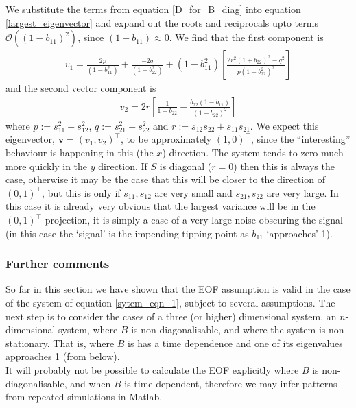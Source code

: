 \documentclass[11pt,a4paper,reqno]{article}
\numberwithin{equation}{section}
\begin{document}
We substitute the terms from equation \ref{D_for_B_diag} into equation \ref{largest_eigenvector} and expand out the roots and reciprocals upto terms $\mathcal{O}((1-b_{11})^2)$, since $(1-b_{11})\approx 0$. We find that the first component is
\begin{align}
 v_1 = \frac{2p}{(1-b_{11}^2)} + 
\frac{-2q}{(1-b_{22}^2)}+
(1-b_{11}^2) \left[ \frac{2r^2(1+ b_{22})^2 -  q^2 }{p(1-b_{22}^2)^2}\right]
\end{align} 
and the second vector component is
\begin{align}
v_2 = 2r\left[\frac{1}{1-b_{22}} -
\frac{b_{22}(1-b_{11})}{(1-b_{22})^2}
\right]
\end{align}
where $p := s_{11}^2+s_{12}^2$, $q := s_{21}^2+s_{22}^2$ and $r := s_{12}s_{22}+s_{11}s_{21}$. We expect this eigenvector, $\mathbf{v} = (v_1, v_2)^\top$, to be approximately $(1,0)^\top$, since the ``interesting'' behaviour is happening in this (the $x$) direction. The system tends to zero much more quickly in the $y$ direction. If $S$ is diagonal ($r=0$) then this is always the case, otherwise it may be the case that this will be closer to the direction of $(0,1)^\top$, but this is only if $s_{11},s_{12}$ are very small and $s_{21},s_{22}$ are very large. In this case it is already very obvious that the largest variance will be in the $(0,1)^\top$ projection, it is simply a case of a very large noise obscuring the signal (in this case the `signal' is the impending tipping point as $b_{11}$ `approaches' 1).

\subsubsection{Further comments}

So far in this section we have shown that the EOF assumption is valid in the case of the system of equation \ref{sytem_eqn_1}, subject to several assumptions. The next step is to consider the cases of a three (or higher) dimensional system, an $n$-dimensional system, where $B$ is non-diagonalisable, and where the system is non-stationary. That is, where $B$ is has a time dependence and one of its eigenvalues approaches 1 (from below). \\

It will probably not be possible to calculate the EOF explicitly where $B$ is non-diagonalisable, and when $B$ is time-dependent, therefore we may infer patterns from repeated simulations in Matlab.
\end{document}
